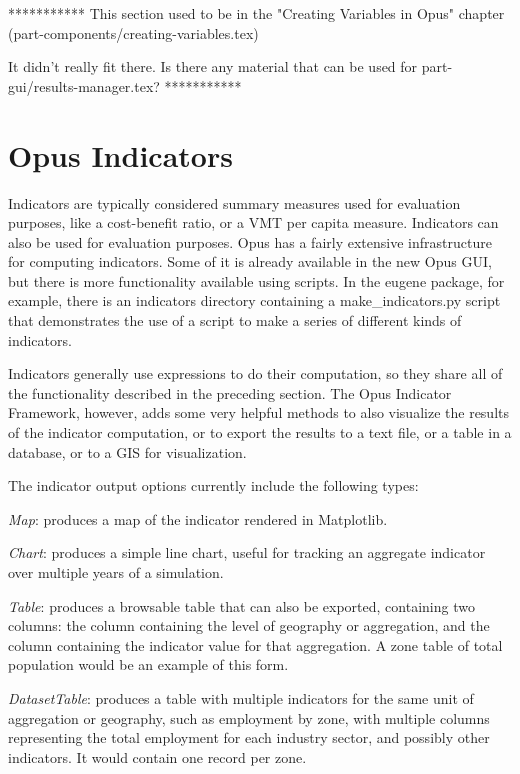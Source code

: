 ***********
This section used to be in the "Creating Variables in Opus" chapter (part-components/creating-variables.tex)

It didn't really fit there.  Is there any material that can be used for part-gui/results-manager.tex?
***********

\section{Opus Indicators}
\label{sec:opus-indicators}

Indicators are typically considered summary measures used for
evaluation purposes, like a cost-benefit ratio, or a VMT per capita
measure.  Indicators can also be used for evaluation purposes.  Opus
has a fairly extensive infrastructure for computing indicators.  Some
of it is already available in the new Opus GUI, but there is more
functionality available using scripts.  In the eugene package, for
example, there is an indicators directory containing a
make\_indicators.py script that demonstrates the use of a script to
make a series of different kinds of indicators.  

Indicators generally use expressions to do their computation, so they
share all of the functionality described in the preceding section.  The
Opus Indicator Framework, however, adds some very helpful methods to
also visualize the results of the indicator computation, or to export
the results to a text file, or a table in a database, or to a GIS for
visualization.

The indicator output options currently include the following types:

\squishlist 
\item \emph{Map}: produces a map of the indicator rendered
in Matplotlib. 
\item \emph{Chart}: produces a simple line chart, useful for tracking
an aggregate indicator over multiple years of a simulation. 
\item \emph{Table}: produces a browsable table that can also be
exported, containing two columns: the column containing the level of geography or
aggregation, and the column containing the indicator value for that
aggregation.  A zone table of total population would be an example of
this form. 
\item \emph{DatasetTable}: produces a table with multiple
indicators for the same unit of aggregation or geography, such as
employment by zone, with multiple columns representing the total
employment for each industry sector, and possibly other indicators.  It
would contain one record per zone. 
\squishend

